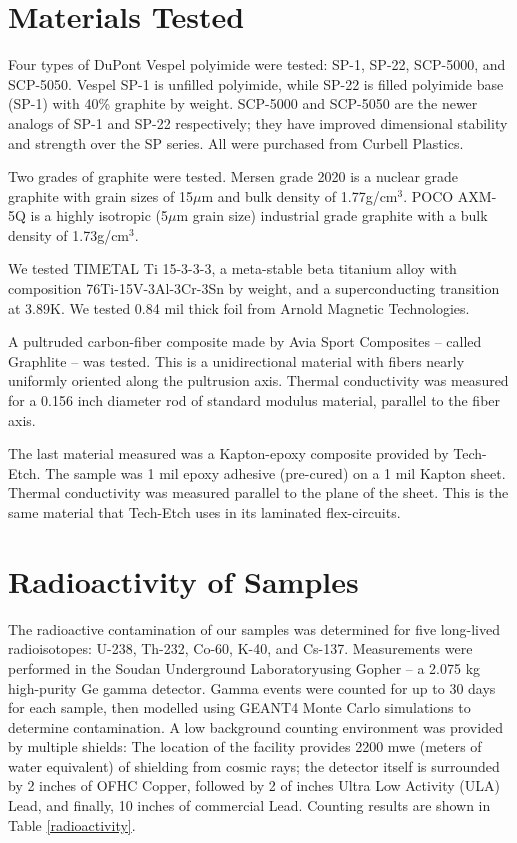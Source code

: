\documentclass[final]{svjour2}
\begin{document}
\section{Materials Tested}
Four types of DuPont Vespel polyimide were tested: SP-1, SP-22, SCP-5000, and SCP-5050.  Vespel SP-1 is unfilled polyimide, while SP-22 is filled polyimide base (SP-1) with 40\% graphite by weight. SCP-5000 and SCP-5050 are the newer analogs of SP-1 and SP-22 respectively; they have improved dimensional stability and strength over the SP series. All were purchased from Curbell Plastics.

Two grades of graphite were tested. Mersen grade 2020 is a nuclear grade graphite with grain sizes of 15$\mu$m and bulk density of 1.77g/cm$^3$. POCO AXM-5Q is a highly isotropic (5$\mu$m grain size) industrial grade graphite with a bulk density of 1.73g/cm$^3$.

We tested TIMETAL Ti 15-3-3-3, a meta-stable beta titanium alloy with composition 76Ti-15V-3Al-3Cr-3Sn by weight, and a superconducting transition at 3.89K. We tested 0.84 mil thick foil from Arnold Magnetic Technologies.

A pultruded carbon-fiber composite made by Avia Sport Composites -- called Graphlite -- was tested. This is a unidirectional material with fibers nearly uniformly oriented along the pultrusion axis. Thermal conductivity was measured for a 0.156 inch diameter rod of standard modulus material, parallel to the fiber axis.

The last material measured was a Kapton-epoxy composite provided by Tech-Etch. The sample was 1 mil epoxy adhesive (pre-cured) on a 1 mil Kapton sheet. Thermal conductivity was measured parallel to the plane of the sheet. This is the same material that Tech-Etch uses in its laminated flex-circuits.

\section{Radioactivity of Samples}
The radioactive contamination of our samples was determined for five long-lived radioisotopes: U-238, Th-232, Co-60, K-40, and Cs-137. Measurements were performed in the Soudan Underground Laboratory\footnotemark using Gopher -- a 2.075 kg high-purity Ge gamma detector. Gamma events were counted for up to 30 days for each sample, then modelled using GEANT4 Monte Carlo simulations to determine contamination. A low background counting environment was provided by multiple shields: The location of the facility provides 2200 mwe (meters of water equivalent) of shielding from cosmic rays; the detector itself is surrounded by 2 inches of OFHC Copper, followed by 2 of inches Ultra Low Activity (ULA) Lead, and finally, 10 inches of commercial Lead. Counting results are shown in Table \ref{radioactivity}.
\end{document}
